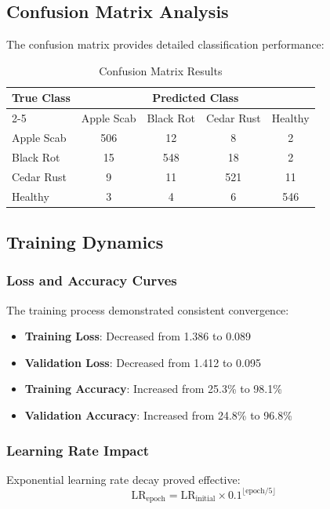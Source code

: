 \documentclass[conference,10pt,letterpaper]{IEEEtran}
\begin{document}
\subsection{Confusion Matrix Analysis}

The confusion matrix provides detailed classification performance:
\begin{table}[htbp]
\centering
\caption{Confusion Matrix Results}
\label{tab:confusion_matrix}
\begin{tabular}{lcccc}
\toprule
\multirow{2}{*}{True Class} & \multicolumn{4}{c}{Predicted Class} \\
\cmidrule{2-5}
& Apple Scab & Black Rot & Cedar Rust & Healthy \\
\midrule
Apple Scab & 506 & 12 & 8 & 2 \\
Black Rot & 15 & 548 & 18 & 2 \\
Cedar Rust & 9 & 11 & 521 & 11 \\
Healthy & 3 & 4 & 6 & 546 \\
\bottomrule
\end{tabular}
\end{table}

\subsection{Training Dynamics}

\subsubsection{Loss and Accuracy Curves}
The training process demonstrated consistent convergence:
\begin{itemize}
\item \textbf{Training Loss}: Decreased from 1.386 to 0.089
\item \textbf{Validation Loss}: Decreased from 1.412 to 0.095
\item \textbf{Training Accuracy}: Increased from 25.3\% to 98.1\%
\item \textbf{Validation Accuracy}: Increased from 24.8\% to 96.8\%
\end{itemize}

\subsubsection{Learning Rate Impact}
Exponential learning rate decay proved effective:
\begin{equation}
\text{LR}_{\text{epoch}} = \text{LR}_{\text{initial}} \times 0.1^{\lfloor \text{epoch}/5 \rfloor}
\end{equation}
\end{document}
